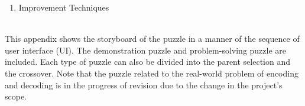 \documentclass[12pt,oneside,openright,a4paper]{cpe-english-project}
\begin{document}
\begin{itemize}
\begin{enumerate}
		\item Improvement Techniques \\
		\begin{minipage}[c]{\textwidth}\centering {}  \end{minipage}
	\end{enumerate}
\end{itemize}
\newpage


  \\
\label{appendix:puzzle-storyboard}
This appendix shows the storyboard of the puzzle in a manner of the sequence of user interface (UI). The demonstration puzzle and problem-solving puzzle are included. Each type of puzzle can also be divided into the parent selection and the crossover. Note that the puzzle related to the real-world problem of encoding and decoding is in the progress of revision due to the change in the project's scope.
\end{document}
